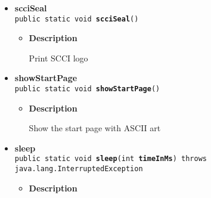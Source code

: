 {{{{{{\begin{itemize}
{\begin{itemize}
{Save the game
}
\item{
{\bf  Parameters}
  \begin{itemize}
   \item{
\texttt{player} -- the game's player}
  \end{itemize}
}%
\item{{\bf  Returns} -- 
true if the saving is a success; false otherwise 
}%
\end{itemize}
}%
\item{ 
{\bf  scciSeal}\\
\texttt{public static void\ {\bf  scciSeal}()
\label{personOfInterest.Game.scciSeal()}}%
\begin{itemize}
\item{
{\bf  Description}

Print SCCI logo
}
\end{itemize}
}%
\item{ 
{\bf  showStartPage}\\
\texttt{public static void\ {\bf  showStartPage}()
\label{personOfInterest.Game.showStartPage()}}%
\begin{itemize}
\item{
{\bf  Description}

Show the start page with ASCII art
}
\end{itemize}
}%
\item{ 
{\bf  sleep}\\
\texttt{public static void\ {\bf  sleep}(\texttt{int} {\bf  timeInMs}) throws java.lang.InterruptedException
\label{personOfInterest.Game.sleep(int)}}%
\begin{itemize}
\item{
{\bf  Description}

}
\end{itemize}}
\end{itemize}}}}}}}
